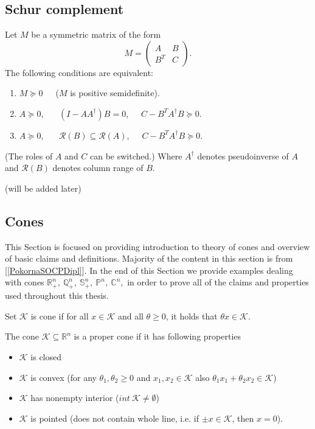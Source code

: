 \documentclass[12pt]{book}
\theoremstyle{definition}
\begin{document}
\begin{appendix}


\chapter{ }
\section{Schur complement}

\label{SchurCompl}
Let $M$ be a symmetric matrix of the form
$$M = \left(\begin{array}{cc}
A & B\\
B^T & C
\end{array}\right).$$ 
The following conditions are equivalent:
\begin{enumerate}
\item $M\succeq 0$\ \ \ ($M$ is positive semidefinite).
\item $A\succeq 0$, \ \ \ $(I-AA^\dagger)B = 0$,\ \ \ $C - B^TA^\dagger B \succeq 0$.
\item $A\succeq 0$, \ \ \ $\mathcal{R}(B)\subseteq \mathcal{R}(A)$,\ \ \ $C - B^TA^\dagger B \succeq 0$.
\end{enumerate}
(The roles of $A$ and $C$ can be switched.)
Where $A^\dagger$ denotes pseudoinverse of $A$ and $\mathcal{R}(B)$ denotes column range of $B$. \rm 

\proof (will be added later)


\section{Cones}
\label{Cones}
This Section is focused on providing introduction to theory of cones and overview of basic claims and definitions.
Majority of the content in this section is from [\ref{PokornaSOCPDipl}]. In the end of this Section we provide examples dealing with cones $\mathbb{R}^n_+,\ \mathbb{Q}^n_+,\ \mathbb{S}^n_+, \ \mathbb{P}^n,\ \mathbb{C}^n,$  in order to prove all of the claims and properties used throughout this thesis.

\label{defCone}
Set $\mathcal{K}$ is cone if for all $x\in \mathcal{K}$ and all $\theta\geq 0$, it holds that $\theta x \in \mathcal{K}$.



\label{defProperCone}
The cone $\mathcal{K}\subseteq \mathbb{R}^n$ is a proper cone if it has following properties
\begin{itemize}
\item $\mathcal{K}$ is closed
\item $\mathcal{K}$ is convex (for any $\theta_1,\theta_2\geq 0$ and $x_1,x_2\in\mathcal{K}$ also $\theta_1x_1 + \theta_2x_2 \in\mathcal{K}$)
\item $\mathcal{K}$ has nonempty interior  ($int \ \mathcal{K} \neq \emptyset$)
\item $\mathcal{K}$ is pointed (does not contain whole line, i.e. if $\pm x\in \mathcal{K}$, then $x=0$).
\end{itemize}


\end{appendix}
\end{document}
